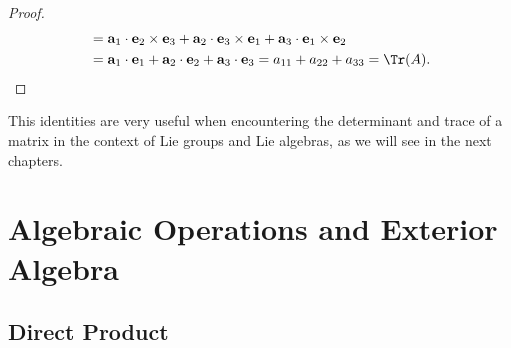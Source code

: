 \begin{proof}
\[\begin{aligned}
                                                                                           & = \mathbf{a}_1 \cdot \mathbf{e}_2 \times \mathbf{e}_3 + \mathbf{a}_2 \cdot \mathbf{e}_3 \times \mathbf{e}_1 + \mathbf{a}_3 \cdot \mathbf{e}_1 \times \mathbf{e}_2 \\
                                                                                           & = \mathbf{a}_1 \cdot \mathbf{e}_1 + \mathbf{a}_2 \cdot \mathbf{e}_2 + \mathbf{a}_3 \cdot \mathbf{e}_3 = a_{11} + a_{22} + a_{33} = \Tr(A).
        \end{aligned}
    \]
\end{proof}

This identities are very useful when encountering the determinant and trace of a matrix in the context of Lie groups and Lie algebras, as we will see in the next chapters.

\section{Algebraic Operations and Exterior Algebra}

\subsection{Direct Product}

